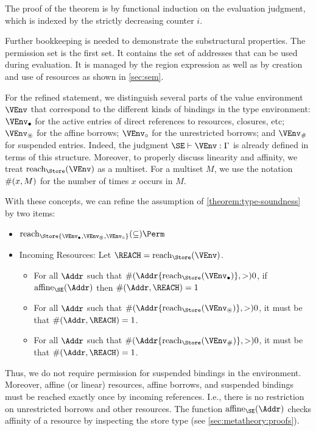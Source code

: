 The proof of the
theorem is by functional induction on the evaluation judgment, which
is indexed by the strictly decreasing counter $i$.

Further bookkeeping is needed to demonstrate the substructural
properties. The permission set is the first set. It contains the set
of addresses that can be used during evaluation. It is managed by the
region expression as well as by creation and use of resources as
shown in \cref{sec:sem}.

For the refined statement, we distinguish several parts of the value
environment $\VEnv$ that correspond to the different kinds of bindings in the
type environment: $\Active\VEnv$ for the active entries of direct
references to resources, closures, etc; $\MutableBorrows\VEnv$ for the
affine borrows; $\ImmutableBorrows\VEnv$ for the unrestricted borrows;
and $\Suspended\VEnv$ for suspended entries. Indeed, the judgment
$\SE \vdash \VEnv:\E$ is already defined in terms of this structure.
Moreover, to properly discuss linearity and affinity, we treat
$\Reach\Store\VEnv$ as a multiset. For a multiset
$M$, we use the notation $\#(x,M)$ for the number of times $x$ occurs in $M$.


With these concepts, we can refine the assumption of
\cref{theorem:type-soundness} by two items:
\begin{itemize}
\item $\Reach\Store{\Active\VEnv, \MutableBorrows\VEnv, \ImmutableBorrows\VEnv} \subseteq \Perm$
\item Incoming Resources: Let $\REACH = \Reach\Store\VEnv$.
  \begin{itemize}
  \item 
    For all $\Addr$ such that $\MultiNumber\Addr{\Reach{\Store}{\Active\VEnv}} >0$,
    if $\Affine{\SE}\Addr$ then $\MultiNumber\Addr\REACH= 1$
  \item For all $\Addr$ such that $
    \MultiNumber\Addr{\Reach{\Store}{\MutableBorrows\VEnv}} >0$, it
    must be that $\MultiNumber\Addr\REACH=1$.
  \item For all $\Addr$ such that $
    \MultiNumber\Addr{\Reach{\Store}{\Suspended\VEnv}} >0$, it
    must be that $\MultiNumber\Addr\REACH=1$.
  \end{itemize}
\end{itemize}
Thus, we do not require permission for suspended bindings in the
environment. Moreover, affine (or linear)  resources, affine
borrows, and suspended bindings must be reached exactly once by
incoming references. I.e., there is no restriction on unrestricted
borrows and other resources. The function $\Affine{\SE}\Addr$ checks
affinity of a resource by inspecting the store type (see
\cref{sec:metatheory:proofs}). 

